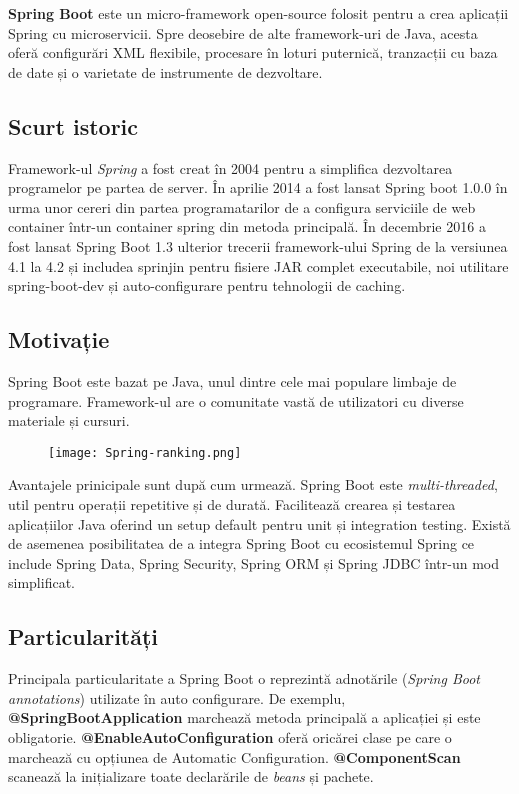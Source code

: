 \textbf{Spring Boot} este un micro-framework open-source folosit pentru a crea aplicații Spring cu microservicii. Spre deosebire de alte framework-uri de Java, acesta oferă configurări XML flexibile, 
procesare în loturi puternică, tranzacții cu baza de date și o varietate de instrumente de dezvoltare.

\subsection{Scurt istoric}
Framework-ul \textit{Spring} a fost creat în 2004 pentru a simplifica dezvoltarea programelor pe partea de server. În aprilie 2014 a fost lansat Spring boot 1.0.0 în urma unor cereri din partea programatarilor de a configura serviciile de web container într-un container spring din metoda principală. În decembrie 2016 a fost lansat Spring Boot 1.3 ulterior trecerii framework-ului Spring de la versiunea 4.1 la 4.2 și includea sprinjin pentru fisiere JAR complet executabile, noi utilitare spring-boot-dev și auto-configurare pentru tehnologii de caching. 

\subsection{Motivație}
Spring Boot este bazat pe Java, unul dintre cele mai populare limbaje de programare. Framework-ul are o comunitate vastă de utilizatori cu diverse materiale și cursuri.

\begin{figure}[H]
	\centering
	\texttt{[image: Spring-ranking.png]}
	\caption{\cite{spring-popularity}}
\end{figure}

Avantajele prinicipale sunt după cum urmează. Spring Boot este \textit{multi-threaded}, util pentru operații repetitive și de durată. Facilitează crearea și testarea aplicațiilor Java oferind un setup default pentru unit și integration testing. Există de asemenea posibilitatea de a integra Spring Boot cu ecosistemul Spring ce include Spring Data, Spring Security, Spring ORM și Spring JDBC într-un mod simplificat.

\subsection{Particularități}
Principala particularitate a Spring Boot o reprezintă adnotările (\textit{Spring Boot annotations}) utilizate în auto configurare.
De exemplu, \textbf{@SpringBootApplication} marchează metoda principală a aplicației și este obligatorie.
\textbf{@EnableAutoConfiguration} oferă oricărei clase pe care o marchează cu opțiunea de Automatic Configuration.
\textbf{@ComponentScan} scanează la inițializare toate declarările de \textit{beans} și pachete.


